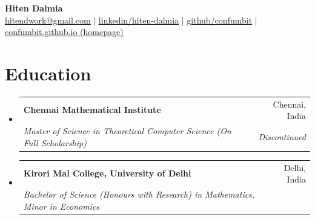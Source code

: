 \documentclass[letterpaper,11pt]{article}
\makeatletter
\newcommand{\resumeSubheading}[4]{
  \vspace{-2pt}\item
    \begin{tabular*}{0.97\textwidth}[t]{l@{\extracolsep{\fill}}r}
      \textbf{#1} & #2 \\
      \textit{\small#3} & \textit{\small #4} \\
    \end{tabular*}\vspace{-3pt}
}
\newcommand{\resumeSubHeadingListStart}{\begin{itemize}[leftmargin=0.15in, label={}, topsep=3pt, itemsep=5pt, parsep=0pt]}
\newcommand{\resumeSubHeadingListEnd}{\end{itemize}}
\makeatother
\begin{document}
\begin{center}
  \textbf{\Huge Hiten Dalmia} \\ \vspace{1pt}
  \small \href{mailto:hitendwork@gmail.com}{\underline{hitendwork@gmail.com}} |
  \href{https://www.linkedin.com/in/hiten-dalmia/}{\underline{linkedin/hiten-dalmia}} |
  \href{https://github.com/confumbit}{\underline{github/confumbit}} |
  \href{https://confumbit.github.io/index.html}{\underline{confumbit.github.io (homepage)}}
\end{center}


\section{Education}
\resumeSubHeadingListStart
\resumeSubheading
{Chennai Mathematical Institute}{Chennai, India}
{Master of Science in Theoretical Computer Science (On Full Scholarship)}{Discontinued}

\resumeSubheading
{Kirori Mal College, University of Delhi}{Delhi, India}
{Bachelor of Science (Honours with Research) in Mathematics, \footnotesize{Minor in Economics}}{}%
\resumeSubHeadingListEnd

\end{document}
